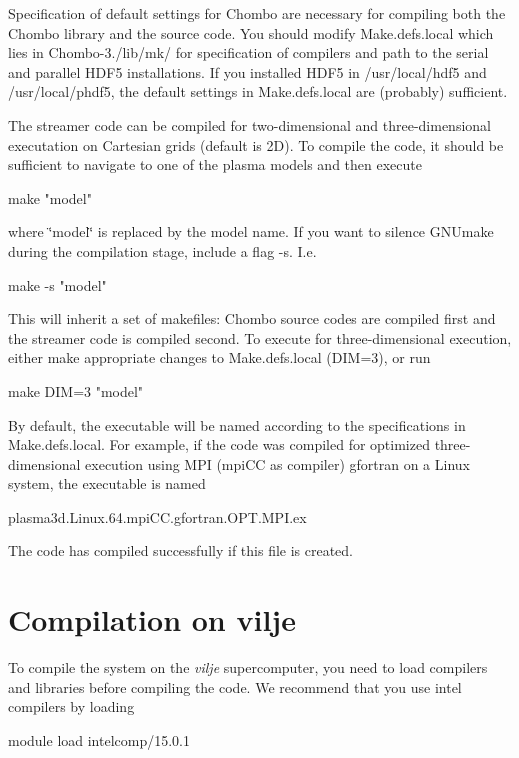 Specification of default settings for Chombo are necessary for compiling both the Chombo library and the source code. You should modify Make.\+defs.\+local which lies in Chombo-\/3./lib/mk/ for specification of compilers and path to the serial and parallel H\+D\+F5 installations. If you installed H\+D\+F5 in /usr/local/hdf5 and /usr/local/phdf5, the default settings in Make.\+defs.\+local are (probably) sufficient.

The streamer code can be compiled for two-\/dimensional and three-\/dimensional executation on Cartesian grids (default is 2D). To compile the code, it should be sufficient to navigate to one of the plasma models and then execute \begin{DoxyVerb}make "model"
\end{DoxyVerb}


where \char`\"{}model\char`\"{} is replaced by the model name. If you want to silence G\+N\+Umake during the compilation stage, include a flag -\/s. I.\+e. \begin{DoxyVerb}make -s "model"
\end{DoxyVerb}


This will inherit a set of makefiles\+: Chombo source codes are compiled first and the streamer code is compiled second. To execute for three-\/dimensional execution, either make appropriate changes to Make.\+defs.\+local (D\+IM=3), or run \begin{DoxyVerb}make DIM=3 "model"
\end{DoxyVerb}


By default, the executable will be named according to the specifications in Make.\+defs.\+local. For example, if the code was compiled for optimized three-\/dimensional execution using M\+PI (mpi\+CC as compiler) gfortran on a Linux system, the executable is named \begin{DoxyVerb}plasma3d.Linux.64.mpiCC.gfortran.OPT.MPI.ex
\end{DoxyVerb}


The code has compiled successfully if this file is created.

\section*{Compilation on vilje }

To compile the system on the {\itshape vilje} supercomputer, you need to load compilers and libraries before compiling the code. We recommend that you use intel compilers by loading \begin{DoxyVerb}module load intelcomp/15.0.1
\end{DoxyVerb}


